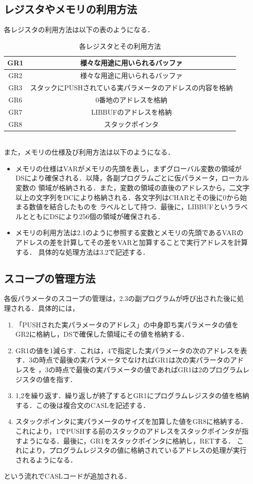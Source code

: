 \documentclass[dvipdfmx]{jarticle}
\begin{document}
\subsection{レジスタやメモリの利用方法}
各レジスタの利用方法は以下の表のようになる．
\begin{table}[h]
  \centering
  \begin{tabular}{|c||c|}
    \hline
    GR1 & 様々な用途に用いられるバッファ\\\hline
    GR2 & 様々な用途に用いられるバッファ\\\hline
    GR3 & スタックにPUSHされている実パラメータのアドレスの内容を格納\\\hline
    GR6 & 0番地のアドレスを格納\\\hline
    GR7 & LIBBUFのアドレスを格納\\\hline
    GR8 & スタックポインタ\\\hline
  \end{tabular}
  \caption{各レジスタとその利用方法}
\end{table}
\\また，メモリの仕様及び利用方法は以下のようになる．
\begin{itemize}
  \item メモリの仕様はVARがメモリの先頭を表し，まずグローバル変数の領域がDSにより確保される．以降，各副プログラムごとに仮パラメータ，ローカル変数の
  領域が格納される．また，変数の領域の直後のアドレスから，二文字以上の文字列をDCにより格納される．各文字列はCHARとその後に0から始まる数値を結合したものを
  ラベルとして持つ．最後に，LIBBUFというラベルとともにDSにより256個の領域が確保される．
  \item メモリの利用方法は2.1のように参照する変数とメモリの先頭であるVARのアドレスの差を計算してその差をVARと加算することで実行アドレスを計算する．
  具体的な処理方法は3.2で記述する．
\end{itemize}
\subsection{スコープの管理方法}
各仮パラメータのスコープの管理は，2.3の副プログラムが呼び出された後に処理される．具体的には，
\begin{enumerate}
  \item 「PUSHされた実パラメータのアドレス」の中身即ち実パラメータの値をGR2に格納し，DSで確保した領域にその値を格納する．
  \item GR1の値を1減らす．これは，4で指定した実パラメータの次のアドレスを表す．3の時点で最後の実パラメータでなければGR1は次の実パラータのアドレスを
  ，3の時点で最後の実パラメータの値であればGR1は2のプログラムレジスタの値を指す．
  \item 1,2を繰り返す．繰り返しが終了するとGR1にプログラムレジスタの値を格納する．この後は複合文のCASLを記述する．
  \item スタックポインタに実パラメータのサイズを加算した値をGR8に格納する．これにより，1でPUSHする前のスタックのアドレスをスタックポインタが指すようになる．最後に，GR1をスタックポインタに格納し，RETする．
  これにより，プログラムレジスタの値に格納されているアドレスの処理が実行されるようになる．
\end{enumerate}
という流れでCASLコードが追加される．
\end{document}
